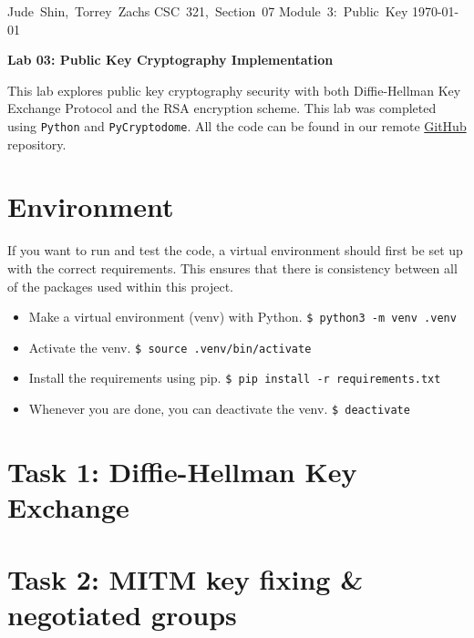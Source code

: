 \documentclass[11pt]{article}
\begin{document}
\hfill\vbox{\hbox{Jude Shin, Torrey Zachs}
		\hbox{CSC 321, Section 07}	
		\hbox{Module 3: Public Key}	
		\hbox{\today}}\par

\bigskip
\centerline{\Large\bf Lab 03: Public Key Cryptography Implementation}\par
\bigskip

This lab explores public key cryptography security with both Diffie-Hellman Key Exchange Protocol and the RSA encryption scheme. This lab was completed using {\tt Python} and {\tt PyCryptodome}. All the code can be found in our remote \href{https://github.com/jude-shin/CSC\_321}{GitHub} repository.

\section*{Environment}

If you want to run and test the code, a virtual environment should first be set up with the correct requirements. This ensures that there is consistency between all of the packages used within this project.

\begin{itemize}
	\item Make a virtual environment (venv) with Python.
		\verb|$ python3 -m venv .venv|
	\item Activate the venv.
		\verb|$ source .venv/bin/activate|
	\item Install the requirements using pip.
		\verb|$ pip install -r requirements.txt|
	\item Whenever you are done, you can deactivate the venv.
		\verb|$ deactivate|
\end{itemize}

\section*{Task 1: Diffie-Hellman Key Exchange}

\section*{Task 2: MITM key fixing \& negotiated groups}

\end{document}
